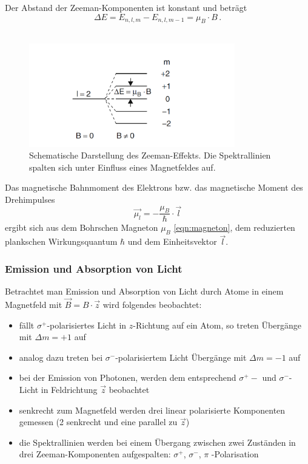 Der Abstand der Zeeman-Komponenten ist konstant und beträgt
\begin{equation*}
    \Delta E = E_{n,l,m} - E_{n,l,m-1} = \mu_B \cdot B \, .
\end{equation*}
\\
\begin{figure}
    \centering
    \includegraphics[width=0.8\textwidth]{content/data/zeeman_aufspaltung.png}
    \caption{Schematische Darstellung des Zeeman-Effekts. Die Spektrallinien spalten sich unter Einfluss eines Magnetfeldes auf.} %
    \label{fig:zeeman_aufspaltung}
\end{figure}

Das magnetische Bahnmoment des Elektrons bzw. das magnetische Moment des Drehimpulses
\begin{equation}
    \vec{\mu_l} = -\frac{\mu_B}{\hbar} \cdot \vec{l}
    \label{eqn:magn_moment_l}
\end{equation}
ergibt sich aus dem Bohrschen Magneton $\mu_B$ \eqref{eqn:magneton}, dem reduzierten plankschen Wirkungsquantum $\hbar$ und dem Einheitsvektor $\vec{l}$.
 
\subsubsection{Emission und Absorption von Licht}
Betrachtet man Emission und Absorption von Licht durch Atome in einem Magnetfeld mit $\vec{B} = B \cdot \vec{z}$ wird folgendes beobachtet:

\begin{itemize}
    \item fällt $\sigma^+$-polarisiertes Licht in $z$-Richtung auf ein Atom, so treten Übergänge mit $\Delta m = +1$ auf
    \item analog dazu treten bei $\sigma^-$-polarisiertem Licht Übergänge mit $\Delta m = -1$ auf
    \item bei der Emission von Photonen, werden dem entsprechend $\sigma^+ -$ und $\sigma^-$-Licht in Feldrichtung $\vec{z}$ beobachtet
    \item senkrecht zum Magnetfeld werden drei linear polarisierte Komponenten gemessen (2 senkrecht und eine parallel zu $\vec{z}$)
    \item die Spektrallinien werden bei einem Übergang zwischen zwei Zuständen in drei Zeeman-Komponenten aufgespalten: $\sigma^+$, $\sigma^-$, $\pi$ -Polarisation
\end{itemize}